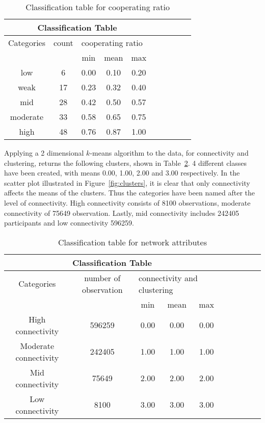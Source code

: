 \begin{table}[H]
	\centering
	\begin{adjustbox}{width=0.4\textwidth}
		\small
		\begin{tabular}{cccccccccc}
				\toprule
			\multicolumn{5}{|c|}{Classification Table}                        \\ \hline
			Categories & count & \multicolumn{3}{l}{cooperating ratio}        \\ \hline
			         &    & min  & mean & max  \\ \hline
			low      & 6  & 0.00 & 0.10 & 0.20 \\ \hline
			weak     & 17 & 0.23 & 0.32 & 0.40 \\ \hline
			mid      & 28 & 0.42 & 0.50 & 0.57 \\ \hline
			moderate & 33 & 0.58 & 0.65 & 0.75 \\ \hline
			high     & 48 & 0.76 & 0.87 & 1.00 \\ \bottomrule
		\end{tabular}
	\end{adjustbox}
	\caption{Classification table for cooperating ratio}
	\label{table:class}
\end{table}

Applying a 2 dimensional \(k\)-means algorithm to the data, for connectivity and
clustering, returns the following clusters, shown in Table~\ref{table:clusters}.
4 different classes have been created, with means 0.00, 1.00, 2.00 and 3.00 respectively.
In the scatter plot illustrated in Figure~\ref{fig:clusters}, it is clear that only connectivity
affects the means of the clusters. Thus the categories have been named after
the level of connectivity. High connectivity consists of 8100 observations,
moderate connectivity of 75649 observation. Lastly, mid connectivity includes
242405 participants and low connectivity 596259.

\begin{table}[!hbtp]
	\centering
	\begin{adjustbox}{width=0.7\textwidth}
		\small
		\begin{tabular}{cccccccccc}
				\toprule
			\multicolumn{5}{|c|}{Classification Table} \\ \hline
			Categories & number of observation & \multicolumn{3}{l|}{connectivity and clustering} \\ \hline
			                      &        & min  & mean & max  \\ \hline
			High connectivity     & 596259 & 0.00 & 0.00 & 0.00 \\ \hline
			Moderate connectivity & 242405 & 1.00 & 1.00 & 1.00 \\ \hline
			Mid connectivity      & 75649  & 2.00 & 2.00 & 2.00 \\ \hline
			Low connectivity      & 8100   & 3.00 & 3.00 & 3.00 \\ \bottomrule
		\end{tabular}
	\end{adjustbox}
	\caption{Classification table for network attributes}
	\label{table:clusters}
\end{table}

